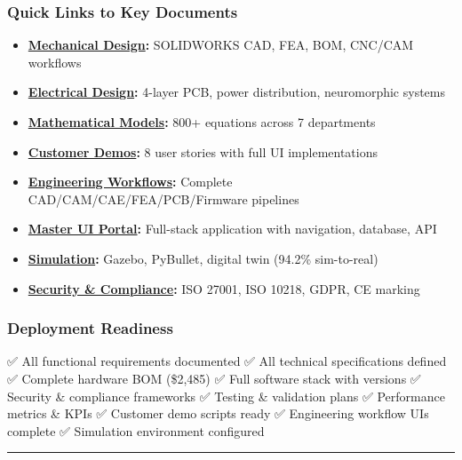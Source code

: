 \documentclass[
]{article}
\providecommand{\tightlist}{%
  \setlength{\itemsep}{0pt}\setlength{\parskip}{0pt}}
\begin{document}
\hypertarget{quick-links-to-key-documents}{%
\subsubsection{Quick Links to Key
Documents}\label{quick-links-to-key-documents}}

\begin{itemize}
\tightlist
\item
  \textbf{\href{./20_CAD_CAM_CAE_Mechanical_Design.md}{Mechanical
  Design}:} SOLIDWORKS CAD, FEA, BOM, CNC/CAM workflows
\item
  \textbf{\href{./21_Electrical_Design_Documentation.md}{Electrical
  Design}:} 4-layer PCB, power distribution, neuromorphic systems
\item
  \textbf{\href{./22_Comprehensive_Mathematical_Models.md}{Mathematical
  Models}:} 800+ equations across 7 departments
\item
  \textbf{\href{./23_Customer_Demo_UI_Showcase_Complete.md}{Customer
  Demos}:} 8 user stories with full UI implementations
\item
  \textbf{\href{./24_Engineering_Workflow_UIs_Complete_Pipeline.md}{Engineering
  Workflows}:} Complete CAD/CAM/CAE/FEA/PCB/Firmware pipelines
\item
  \textbf{\href{./25_Master_UI_Portal_with_Navigation.md}{Master UI
  Portal}:} Full-stack application with navigation, database, API
\item
  \textbf{\href{./26_Simulation_Virtual_Prototyping.md}{Simulation}:}
  Gazebo, PyBullet, digital twin (94.2\% sim-to-real)
\item
  \textbf{\href{./27_Final_Documentation_Complete_Set.md}{Security \&
  Compliance}:} ISO 27001, ISO 10218, GDPR, CE marking
\end{itemize}

\hypertarget{deployment-readiness}{%
\subsubsection{Deployment Readiness}\label{deployment-readiness}}

✅ All functional requirements documented ✅ All technical
specifications defined ✅ Complete hardware BOM (\$2,485) ✅ Full
software stack with versions ✅ Security \& compliance frameworks ✅
Testing \& validation plans ✅ Performance metrics \& KPIs ✅ Customer
demo scripts ready ✅ Engineering workflow UIs complete ✅ Simulation
environment configured

\begin{center}\rule{0.5\linewidth}{0.5pt}\end{center}
\end{document}
